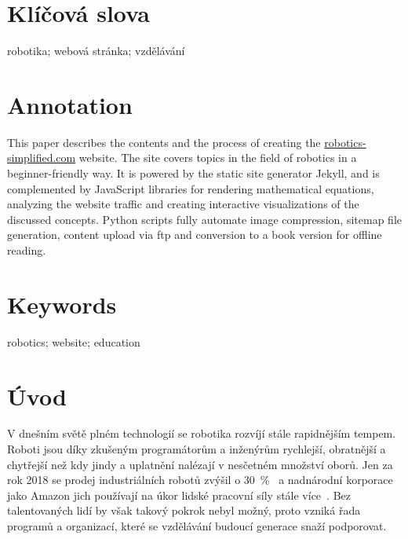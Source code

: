 \documentclass[a4paper, 12pt, twoside]{article}
\begin{document}
  \section*{\normalfont\textbf{Klíčová slova}}
  robotika; webová stránka; vzdělávání

  \section*{\normalfont\textbf{Annotation}}
  This paper describes the contents and the process of creating the \url{robotics-simplified.com} website. The site covers topics in the field of robotics in a beginner-friendly way. It is powered by the static site generator Jekyll, and is complemented by JavaScript libraries for rendering mathematical equations, analyzing the website traffic and creating interactive visualizations of the discussed concepts. Python scripts fully automate image compression, sitemap file generation, content upload via \acrshort{ftp} and conversion to a book version for offline reading.

  \section*{\normalfont\textbf{Keywords}}
  robotics; website; education

  \cleardoublepage

  \setcounter{page}{9}%


  \tableofcontents

  \cleardoublepage

  \printglossary[type=\acronymtype, title=Seznam zkratek]

  \cleardoublepage

  \section{Úvod}
  V dnešním světě plném technologií se robotika rozvíjí stále rapidnějším tempem. Roboti jsou díky zkušeným programátorům a inženýrům rychlejší, obratnější a chytřejší než kdy jindy a uplatnění nalézají v nesčetném množství oborů. Jen za rok 2018 se prodej industriálních robotů zvýšil o \SI{30}{\percent}~\cite{industrial-robot-growth} a nadnárodní korporace jako Amazon jich používají na úkor lidské pracovní síly stále více~\cite{amazon-hiring}. Bez talentovaných lidí by však takový pokrok nebyl možný, proto vzniká řada programů a organizací, které se vzdělávání budoucí generace snaží podporovat.
\end{document}
